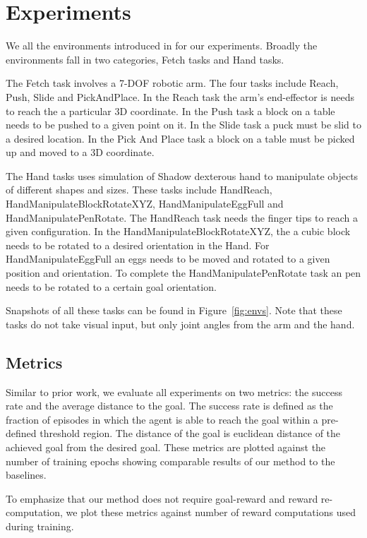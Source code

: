 \section{Experiments}
\label{sec:experiments}
We all the environments  introduced in \citet{plappert201802multigoalrl} for our experiments.
Broadly the environments fall in two categories, Fetch tasks and Hand tasks.

The Fetch task involves a 7-DOF robotic arm. The four tasks include Reach, Push,
Slide and PickAndPlace.
In the Reach task the arm's end-effector is needs to reach the a particular 3D coordinate. 
In the Push task a block on a table needs to be pushed to a given point on it.
In the Slide task a puck must be slid to a desired location.
In the Pick And Place task a block on a table must be picked up and moved to a
3D coordinate.

The Hand tasks uses simulation of Shadow dexterous hand to manipulate objects of
different shapes and sizes. These tasks include HandReach,
HandManipulateBlockRotateXYZ, HandManipulateEggFull and HandManipulatePenRotate.
The HandReach task needs the finger tips to reach a given configuration.
In the HandManipulateBlockRotateXYZ, the a cubic block needs to be rotated to a
desired orientation in the Hand.
For HandManipulateEggFull an eggs needs to be moved and rotated to a given
position and orientation.
To complete the HandManipulatePenRotate task an pen needs to be rotated to a
certain goal orientation.

Snapshots of all these tasks can be found in Figure~\ref{fig:envs}. Note that
these tasks do not take visual input, but only joint angles from the arm and the hand.

\subsection{Metrics}
Similar to prior work, we evaluate all experiments on two metrics: the success
rate and the average distance to the goal. The success rate is defined as the
fraction of episodes in which the agent is able to reach the goal within a
pre-defined threshold region.
The distance of the goal is euclidean distance of the
achieved goal from the desired goal.
These metrics are plotted against the number of training epochs showing
comparable results of our method to the baselines.

To emphasize that our method does not require goal-reward
and reward re-computation, we plot these metrics against
number of reward computations used during training.

